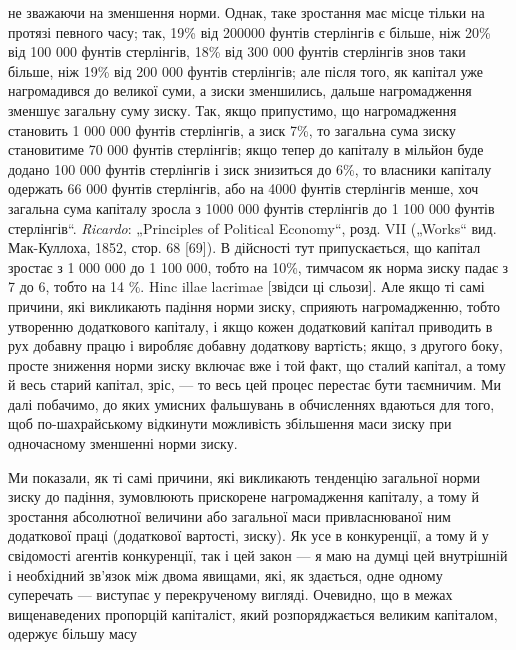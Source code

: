 {не зважаючи на зменшення норми. Однак, таке зростання має місце тільки на
протязі певного часу; так, 19\% від 200000 фунтів стерлінгів є більше, ніж 20\%
від 100 000 фунтів стерлінгів, 18\% від 300 000 фунтів стерлінгів знов таки
більше, ніж 19\% від 200 000 фунтів стерлінгів; але після того, як капітал уже
нагромадився до великої суми, а зиски зменшились, дальше нагромадження
зменшує загальну суму зиску. Так, якщо припустимо, що нагромадження
становить 1 000 000 фунтів стерлінгів, а зиск 7\%, то загальна сума зиску становитиме
70 000 фунтів стерлінгів; якщо тепер до капіталу в мільйон буде
додано 100 000 фунтів стерлінгів і зиск знизиться до 6\%, то власники капіталу
одержать 66 000 фунтів стерлінгів, або на 4000 фунтів стерлінгів менше, хоч
загальна сума капіталу зросла з 1000 000 фунтів стерлінгів до 1 100 000 фунтів
стерлінгів“. \emph{Ricardo}: „Principles of Political Economy“, розд. VII („Works“
вид. Мак-Куллоха, 1852, стор. 68 [69]). В дійсності тут припускається, що капітал
зростає з 1 000 000 до 1 100 000, тобто на 10\%, тимчасом як норма зиску
падає з 7 до 6, тобто на 14 \%. Hinc illae lacrimae [звідси ці сльози].} Але
якщо ті самі причини, які викликають падіння норми зиску,
сприяють нагромадженню, тобто утворенню додаткового капіталу,
і якщо кожен додатковий капітал приводить в рух добавну
працю і виробляє добавну додаткову вартість; якщо, з другого
боку, просте зниження норми зиску включає вже і той
факт, що сталий капітал, а тому й весь старий капітал, зріс, —
то весь цей процес перестає бути таємничим. Ми далі побачимо,
до яких умисних фальшувань в обчисленнях вдаються
для того, щоб по-шахрайському відкинути можливість збільшення
маси зиску при одночасному зменшенні норми зиску.

Ми показали, як ті самі причини, які викликають тенденцію
загальної норми зиску до падіння, зумовлюють прискорене нагромадження
капіталу, а тому й зростання абсолютної величини або
загальної маси привласнюваної ним додаткової праці (додаткової
вартості, зиску). Як усе в конкуренції, а тому й у свідомості
агентів конкуренції, так і цей закон — я маю на думці цей внутрішній
і необхідний зв’язок між двома явищами, які, як здається,
одне одному суперечать — виступає у перекрученому вигляді.
Очевидно, що в межах вищенаведених пропорцій капіталіст,
який розпоряджається великим капіталом, одержує більшу масу
\parbreak{}  %
